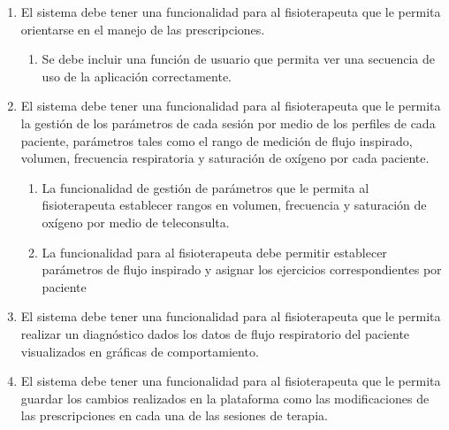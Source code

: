 \documentclass[12pt]{article}
\begin{document}
\begin{enumerate}[start=1,label={\bfseries RF0\arabic*.}]
\begin{enumerate}[label*=\arabic*.]
     
                
            \end{enumerate}
            
    \item  El sistema debe tener una funcionalidad para al fisioterapeuta que le permita orientarse en el manejo de las prescripciones.
    
    \label{RF03}
            \begin{enumerate}[label*=\arabic*.]
                \item Se debe incluir una función de usuario que permita ver una secuencia de uso de la aplicación correctamente. 
            \end{enumerate}
            
    
    \item  El sistema debe tener una funcionalidad para al fisioterapeuta que le permita la gestión de los parámetros de cada sesión por medio de los perfiles de cada paciente, parámetros tales como  el rango de medición de flujo inspirado, volumen, frecuencia respiratoria y saturación de oxígeno por cada paciente. %
    \label{RF04}
            \begin{enumerate}[label*=\arabic*.]
                \item La funcionalidad de gestión de parámetros que le permita al fisioterapeuta establecer rangos en volumen, frecuencia y saturación de oxígeno por medio de teleconsulta. %
                
                \item La funcionalidad para al fisioterapeuta debe permitir establecer parámetros de flujo inspirado y asignar los ejercicios correspondientes por paciente
                
                
            \end{enumerate}
            
    \item El sistema debe tener una funcionalidad para al fisioterapeuta que le permita realizar un diagnóstico dados los datos de flujo respiratorio del paciente visualizados en gráficas de comportamiento.
    

    
    
    \item El sistema debe tener una funcionalidad para al fisioterapeuta que le permita guardar los cambios realizados en la plataforma como las modificaciones de las prescripciones en cada una de las sesiones de terapia.
    

\end{enumerate}
\end{document}
